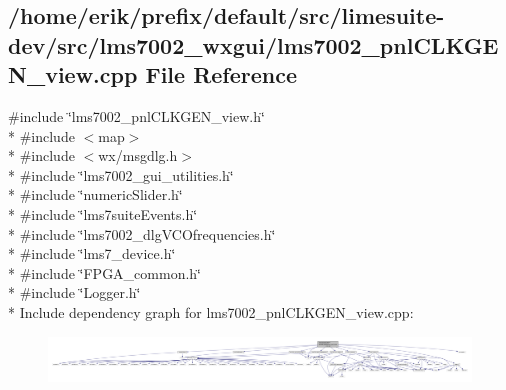 \subsection{/home/erik/prefix/default/src/limesuite-\/dev/src/lms7002\+\_\+wxgui/lms7002\+\_\+pnl\+C\+L\+K\+G\+E\+N\+\_\+view.cpp File Reference}
\label{lms7002__pnlCLKGEN__view_8cpp}
{\ttfamily \#include \char`\"{}lms7002\+\_\+pnl\+C\+L\+K\+G\+E\+N\+\_\+view.\+h\char`\"{}}\\*
{\ttfamily \#include $<$map$>$}\\*
{\ttfamily \#include $<$wx/msgdlg.\+h$>$}\\*
{\ttfamily \#include \char`\"{}lms7002\+\_\+gui\+\_\+utilities.\+h\char`\"{}}\\*
{\ttfamily \#include \char`\"{}numeric\+Slider.\+h\char`\"{}}\\*
{\ttfamily \#include \char`\"{}lms7suite\+Events.\+h\char`\"{}}\\*
{\ttfamily \#include \char`\"{}lms7002\+\_\+dlg\+V\+C\+Ofrequencies.\+h\char`\"{}}\\*
{\ttfamily \#include \char`\"{}lms7\+\_\+device.\+h\char`\"{}}\\*
{\ttfamily \#include \char`\"{}F\+P\+G\+A\+\_\+common.\+h\char`\"{}}\\*
{\ttfamily \#include \char`\"{}Logger.\+h\char`\"{}}\\*
Include dependency graph for lms7002\+\_\+pnl\+C\+L\+K\+G\+E\+N\+\_\+view.\+cpp\+:
\nopagebreak
\begin{figure}[H]
\begin{center}
\leavevmode
\includegraphics[width=350pt]{d5/d10/lms7002__pnlCLKGEN__view_8cpp__incl}
\end{center}
\end{figure}
